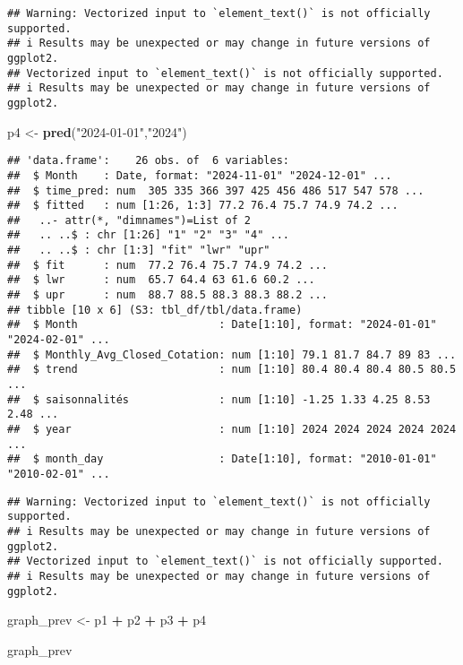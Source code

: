 \documentclass[
]{article}
\newenvironment{Shaded}{\begin{snugshade}}{\end{snugshade}}
\newcommand{\FunctionTok}[1]{\textcolor[rgb]{0.13,0.29,0.53}{\textbf{#1}}}
\newcommand{\NormalTok}[1]{#1}
\newcommand{\OtherTok}[1]{\textcolor[rgb]{0.56,0.35,0.01}{#1}}
\newcommand{\SpecialCharTok}[1]{\textcolor[rgb]{0.81,0.36,0.00}{\textbf{#1}}}
\newcommand{\StringTok}[1]{\textcolor[rgb]{0.31,0.60,0.02}{#1}}
\begin{document}
\begin{verbatim}
## Warning: Vectorized input to `element_text()` is not officially supported.
## i Results may be unexpected or may change in future versions of ggplot2.
## Vectorized input to `element_text()` is not officially supported.
## i Results may be unexpected or may change in future versions of ggplot2.
\end{verbatim}

\begin{Shaded}
\begin{Highlighting}[]
\NormalTok{p4 }\OtherTok{\textless{}{-}} \FunctionTok{pred}\NormalTok{(}\StringTok{"2024{-}01{-}01"}\NormalTok{,}\StringTok{"2024"}\NormalTok{)  }
\end{Highlighting}
\end{Shaded}

\begin{verbatim}
## 'data.frame':    26 obs. of  6 variables:
##  $ Month    : Date, format: "2024-11-01" "2024-12-01" ...
##  $ time_pred: num  305 335 366 397 425 456 486 517 547 578 ...
##  $ fitted   : num [1:26, 1:3] 77.2 76.4 75.7 74.9 74.2 ...
##   ..- attr(*, "dimnames")=List of 2
##   .. ..$ : chr [1:26] "1" "2" "3" "4" ...
##   .. ..$ : chr [1:3] "fit" "lwr" "upr"
##  $ fit      : num  77.2 76.4 75.7 74.9 74.2 ...
##  $ lwr      : num  65.7 64.4 63 61.6 60.2 ...
##  $ upr      : num  88.7 88.5 88.3 88.3 88.2 ...
## tibble [10 x 6] (S3: tbl_df/tbl/data.frame)
##  $ Month                      : Date[1:10], format: "2024-01-01" "2024-02-01" ...
##  $ Monthly_Avg_Closed_Cotation: num [1:10] 79.1 81.7 84.7 89 83 ...
##  $ trend                      : num [1:10] 80.4 80.4 80.4 80.5 80.5 ...
##  $ saisonnalités              : num [1:10] -1.25 1.33 4.25 8.53 2.48 ...
##  $ year                       : num [1:10] 2024 2024 2024 2024 2024 ...
##  $ month_day                  : Date[1:10], format: "2010-01-01" "2010-02-01" ...
\end{verbatim}

\begin{verbatim}
## Warning: Vectorized input to `element_text()` is not officially supported.
## i Results may be unexpected or may change in future versions of ggplot2.
## Vectorized input to `element_text()` is not officially supported.
## i Results may be unexpected or may change in future versions of ggplot2.
\end{verbatim}

\begin{Shaded}
\begin{Highlighting}[]
\NormalTok{graph\_prev }\OtherTok{\textless{}{-}}\NormalTok{ p1 }\SpecialCharTok{+}\NormalTok{ p2 }\SpecialCharTok{+}\NormalTok{ p3 }\SpecialCharTok{+}\NormalTok{ p4 }

\NormalTok{graph\_prev}
\end{Highlighting}
\end{Shaded}
\end{document}
